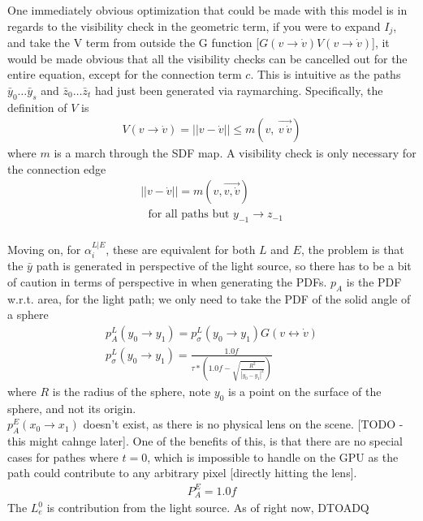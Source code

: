 \documentclass{article}
\begin{document}
    One immediately obvious optimization that could be made with this model is
in regards to the visibility check in the geometric term, if you were to expand
$I_j$, and take the V term from outside the G function
    [$G(v \rightarrow
    \dot{v}) V(v \rightarrow \dot{v})$],
    it would be made obvious that all the visibility checks can be cancelled out
for the entire equation, except for the connection term $c$. This is intuitive
as the paths $\bar{y}_{0} \ldots \bar{y}_s$ and $\bar{z}_0 \ldots \bar{z}_t$ had
just been generated via raymarching. Specifically, the definition of $V$ is
  \begin{align}
    V(v \rightarrow \dot{v}) = ||v - \dot{v}|| \leq
    m(v,\:\overrightarrow{v\:\dot{v}})
  \end{align}
    where $m$ is a march through the SDF map. A visibility check is only
necessary for the connection edge
    \begin{align*}
      ||v - \dot{v}|| = m(v, \overrightarrow{v, \dot{v}})\\
      \:\:\:\text{for all paths but } y_{-1} \rightarrow z_{-1} 
    \end{align*}
\\
    Moving on, for $\alpha^{L|E}_i$, these are equivalent for both $L$ and $E$,
the problem is that the $\bar{y}$ path is generated in perspective of the light
source, so there has to be a bit of caution in terms of perspective in when
generating the PDFs. $p_A$ is the PDF w.r.t. area, for the light path; we only
need to take the PDF of the solid angle of a sphere
  \begin{align}
    p_A^L(y_0 \rightarrow y_1) = p_{\sigma}^L(y_0 \rightarrow y_1) G(v
    \leftrightarrow \dot{v})\\
    p_{\sigma}^L(y_0 \rightarrow y_1) = \frac{1.0f}{\tau * (1.0f -
    \sqrt{\frac{R^2}{|y_0 - y_1|^2}})}
  \end{align}
    where $R$ is the radius of the sphere, note $y_0$ is a point on the surface
of the sphere, and not its origin. \\$p_A^E(x_0 \rightarrow x_1)$ doesn't exist,
as there is no physical lens on the scene. [TODO - this might cahnge later]. One
of the benefits of this, is that there are no special cases for pathes where $t
= 0$, which is impossible to handle on the GPU as the path could contribute to
any arbitrary pixel [directly hitting the lens].
  \begin{align}
    P_A^E = 1.0f
  \end{align}
    The $L^0_e$ is contribution from the light source. As of right now, DTOADQ
\end{document}
